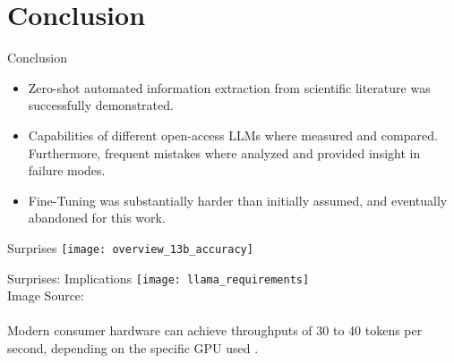 \section{Conclusion}

\begin{frame}[c]{Conclusion}
    \large
    \begin{itemize}[<+(1)->]
        \item Zero-shot automated information extraction from scientific literature was successfully demonstrated.
        \item Capabilities of different open-access \glspl{LLM} where measured and compared. Furthermore, frequent mistakes where analyzed and provided insight in failure modes.
        \item Fine-Tuning was substantially harder than initially assumed, and eventually abandoned for this work.
    \end{itemize}
\end{frame}


\begin{frame}[c]{Surprises}
    \texttt{[image: overview\_13b\_accuracy]}
\end{frame}


\begin{frame}[c]{Surprises: Implications}
    \texttt{[image: llama\_requirements]} \\
    Image Source: \cite{hardwarerequirements_2023}
    \\
    \\
    \large
    Modern consumer hardware can achieve throughputs of 30 to 40 tokens per second, depending on the specific GPU used \cite{hardwarerequirements_2023}.
\end{frame}
